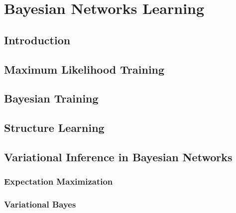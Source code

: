 \documentclass[twoside,openright,titlepage,numbers=noenddot,openany,headinclude,footinclude=true, cleardoublepage=empty,abstractoff,BCOR=5mm,paper=a4,fontsize=11pt]{scrreprt}
\begin{document}
\part{Bayesian Networks Learning}

\chapter{Introduction}



\chapter{Maximum Likelihood Training}



\chapter{Bayesian Training}



\chapter{Structure Learning}



\chapter{Variational Inference in Bayesian Networks}



\section{Expectation Maximization}



\section{Variational Bayes}




\clearpage
\nocite{*}


\end{document}

